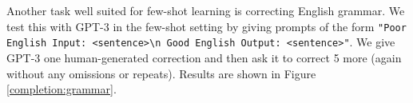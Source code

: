Another task well suited for few-shot learning is correcting English grammar.  We test this with GPT-3 in the few-shot setting by giving prompts of the form \texttt{"Poor English Input: <sentence>{\textbackslash}n Good English Output: <sentence>"}.  We give GPT-3 one human-generated correction and then ask it to correct 5 more (again without any omissions or repeats).  Results are shown in Figure \ref{completion:grammar}.

